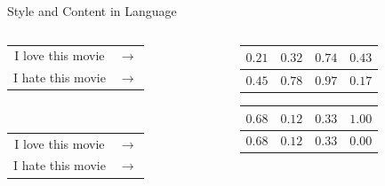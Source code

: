 \documentclass[aspectratio=169]{beamer}
\begin{document}
\begin{frame}{Style and Content in Language}
	\centering
	\begin{columns}[T]
		\begin{column}{.3\textwidth}
			\centering
			\begin{tabular}{ c c }
				I love this movie & $\rightarrow$ \\
				I hate this movie & $\rightarrow$ \\
			\end{tabular} \\
			\vspace{1.8cm}
			{\color{white} \begin{tabular}{ c c }
					I love this movie & $\rightarrow$ \\
					I hate this movie & $\rightarrow$ \\
				\end{tabular}}
		\end{column}
		\hfill
		\begin{column}{.6\textwidth}
			\centering
			\begin{tabular}{ | c | c | c | c | }
				\hline
				$0.21$ & $0.32$ & $0.74$ & $0.43$ \\
				\hline
				\hline
				$0.45$ & $0.78$ & $0.97$ & $0.17$ \\
				\hline
			\end{tabular}
			{\color{white}{\Huge$$\Downarrow$$}
			\begin{tabular}{ | c | c | c | c | }
				\hline
				$0.68$ & $0.12$ & $0.33$ & $1.00$ \\
				\hline
				\hline
				$0.68$ & $0.12$ & $0.33$ & $0.00$ \\
				\hline
			\end{tabular}}
		\end{column}
	\end{columns}
\end{frame}
\end{document}
